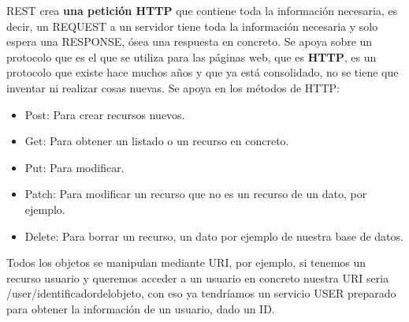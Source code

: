 \documentclass[
	12pt, %
	fleqn, %
	a4paper, %
	oneside, %
]{LegrandOrangeBook}
\begin{document}
REST crea \textbf{una petición HTTP} que contiene toda la información necesaria, es decir, un REQUEST a un servidor tiene toda la información necesaria y solo espera una RESPONSE, ósea una respuesta en concreto. Se apoya sobre un protocolo que es el que se utiliza para las páginas web, que es \textbf{HTTP}, es un protocolo que existe hace muchos años y que ya está consolidado, no se tiene que inventar ni realizar cosas nuevas. Se apoya en los métodos de HTTP:
\begin{itemize}
\item Post: Para crear recursos nuevos.
\item Get: Para obtener un listado o un recurso en concreto.
\item Put: Para modificar.
\item Patch: Para modificar un recurso que no es un recurso de un dato, por ejemplo.
\item Delete: Para borrar un recurso, un dato por ejemplo de nuestra base de datos.
\end{itemize}
Todos los objetos se manipulan mediante URI, por ejemplo, si tenemos un recurso usuario y queremos acceder a un usuario en concreto nuestra URI seria /user/identificadordelobjeto, con eso ya tendríamos un servicio USER preparado para obtener la información de un usuario, dado un ID.
\end{document}

